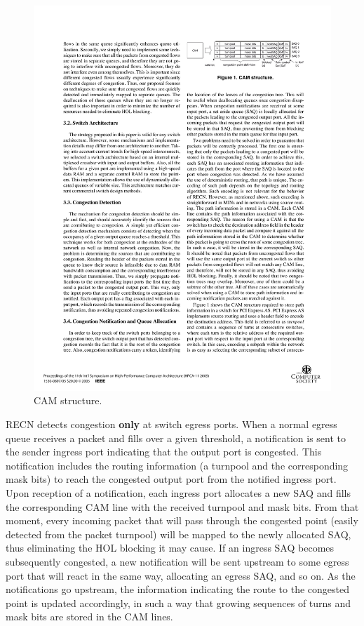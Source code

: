 \documentclass[12pt]{article}
\begin{document}
\begin{figure}[ht]
	\centering
		\includegraphics[scale=1.2]{cam.pdf}
		\caption{CAM structure.}
		\label{fig:cam}
\end{figure}

RECN detects congestion \textbf{only} at switch egress ports. When a normal egress queue receives a packet and fills over a given threshold, a notification is sent to the sender ingress port indicating that the output port is congested. This notification includes the routing information (a turnpool and the corresponding mask bits) to reach the congested output port from the notified ingress port. Upon reception of a notification, each ingress port allocates a new SAQ and fills the corresponding CAM line with the received turnpool and mask bits. From that moment, every incoming packet that will pass through the congested point (easily detected from the packet turnpool) will be mapped to the newly allocated SAQ, thus eliminating the HOL blocking it may cause. If an ingress SAQ becomes subsequently congested, a new notification will be sent upstream to some egress port that will react in the same way, allocating an egress SAQ, and so on. As the notifications go upstream, the information indicating the route to the congested point is updated accordingly, in such a way that growing sequences of turns and mask bits are stored in the CAM lines. 
\end{document}
